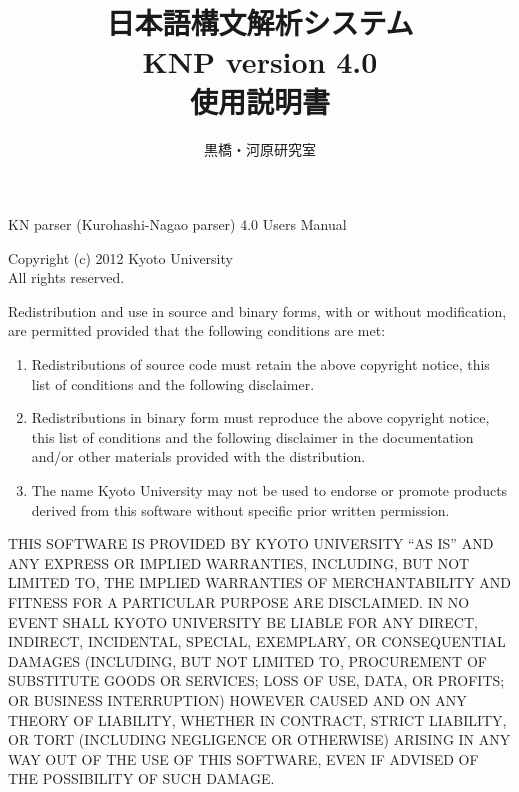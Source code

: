 \documentclass[a4j,11pt,titlepage]{jarticle}
\title{\bf 日本語構文解析システム \\
        KNP version 4.0 \\
        使用説明書}
\author{黒橋・河原研究室}
\date{平成24年1月\\
\rule{0mm}{110mm}Copyright \copyright\ 2012\begin{tabular}[t]{l}
                                京都大学大学院情報学研究科 \\
                                \end{tabular}
}
\begin{document}
\maketitle

\thispagestyle{empty}

\vspace*{\fill}

\begin{small}
\noindent
KN parser (Kurohashi-Nagao parser) 4.0 Users Manual

\noindent
Copyright (c) 2012 Kyoto University \\
All rights reserved.

\noindent
Redistribution and use in source and binary forms, with or without
modification, are permitted provided that the following conditions
are met:

\begin{enumerate}
 \item Redistributions of source code must retain the above copyright
   notice, this list of conditions and the following disclaimer.
 \item Redistributions in binary form must reproduce the above copyright
   notice, this list of conditions and the following disclaimer in the
   documentation and/or other materials provided with the distribution.
 \item The name Kyoto University may not be used to endorse or promote
   products derived from this software without specific prior written
   permission.
\end{enumerate}

\noindent
THIS SOFTWARE IS PROVIDED BY KYOTO UNIVERSITY ``AS IS'' AND ANY
EXPRESS OR IMPLIED WARRANTIES, INCLUDING, BUT NOT LIMITED TO, THE
IMPLIED WARRANTIES OF MERCHANTABILITY AND FITNESS FOR A PARTICULAR
PURPOSE ARE DISCLAIMED.  IN NO EVENT SHALL KYOTO UNIVERSITY BE
LIABLE FOR ANY DIRECT, INDIRECT, INCIDENTAL, SPECIAL, EXEMPLARY, OR
CONSEQUENTIAL DAMAGES (INCLUDING, BUT NOT LIMITED TO, PROCUREMENT OF
SUBSTITUTE GOODS OR SERVICES; LOSS OF USE, DATA, OR PROFITS; OR BUSINESS
INTERRUPTION) HOWEVER CAUSED AND ON ANY THEORY OF LIABILITY, WHETHER IN
CONTRACT, STRICT LIABILITY, OR TORT (INCLUDING NEGLIGENCE OR OTHERWISE)
ARISING IN ANY WAY OUT OF THE USE OF THIS SOFTWARE, EVEN IF ADVISED OF
THE POSSIBILITY OF SUCH DAMAGE.

\vspace{1cm}


\end{small}
\end{document}
